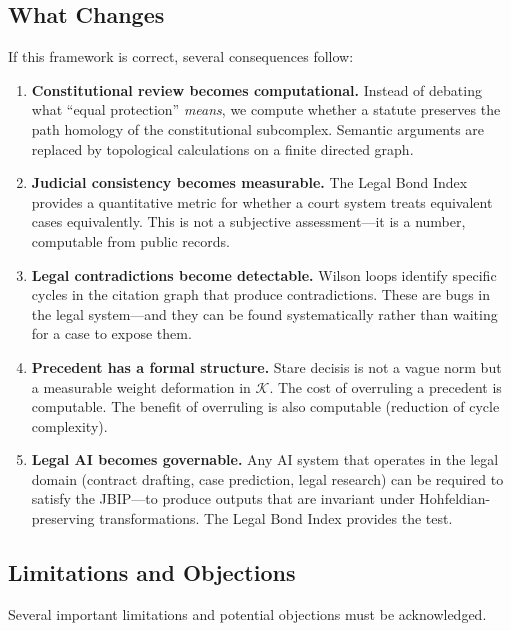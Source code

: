 \documentclass[12pt]{article}
\theoremstyle{definition}
\theoremstyle{remark}
\begin{document}
\subsection{What Changes}

If this framework is correct, several consequences follow:

\begin{enumerate}
    \item \textbf{Constitutional review becomes computational.}  Instead of debating what ``equal protection'' \emph{means}, we compute whether a statute preserves the path homology of the constitutional subcomplex.  Semantic arguments are replaced by topological calculations on a finite directed graph.

    \item \textbf{Judicial consistency becomes measurable.}  The Legal Bond Index provides a quantitative metric for whether a court system treats equivalent cases equivalently.  This is not a subjective assessment---it is a number, computable from public records.

    \item \textbf{Legal contradictions become detectable.}  Wilson loops identify specific cycles in the citation graph that produce contradictions.  These are bugs in the legal system---and they can be found systematically rather than waiting for a case to expose them.

    \item \textbf{Precedent has a formal structure.}  Stare decisis is not a vague norm but a measurable weight deformation in $\mathcal{K}$.  The cost of overruling a precedent is computable.  The benefit of overruling is also computable (reduction of cycle complexity).

    \item \textbf{Legal AI becomes governable.}  Any AI system that operates in the legal domain (contract drafting, case prediction, legal research) can be required to satisfy the JBIP---to produce outputs that are invariant under Hohfeldian-preserving transformations.  The Legal Bond Index provides the test.
\end{enumerate}

\subsection{Limitations and Objections}

Several important limitations and potential objections must be acknowledged.
\end{document}
